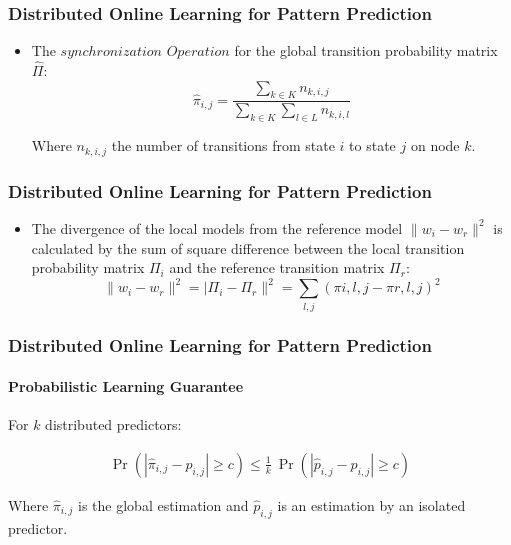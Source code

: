 \frame
{
	\frametitle{Distributed Online Learning for Pattern Prediction}
	\begin{itemize}[]

	\item<1-> The
 $synchronization$ $ Operation$ for the global transition probability matrix $\hat{\Pi}$:
 \begin{equation*}
 \label{eq:dis_pi_estim}
 \hat{\pi}_{i,j} = \frac{\sum_{k \in K} n_{k,i,j}}{\sum_{k \in K} \sum_{l \in L} n_{k,i,l}}
 \end{equation*}

Where $n_{k,i,j}$ the number of transitions from state $i$ to state $j$ on node $k$.
	
\end{itemize}
}

\frame
{
	\frametitle{Distributed Online Learning for Pattern Prediction}
	\begin{itemize}[]
		
		\item<1->The divergence of the local models from the reference model $\|w_i - w_r\|^2$ is calculated by the sum of square difference between the local transition probability matrix $\Pi_i$ and the reference transition matrix $\Pi_r$:
		\begin{equation*}
		\label{eq:dis_pi_varinace}
		\|w_i - w_r\|^2=|\Pi_i - \Pi_r\|^2=\sum_{l,j} (\pi{i,l,j} -\pi{r,l,j})^2
		\end{equation*}
		
	\end{itemize}
}


\frame
{
	\frametitle{Distributed Online Learning for Pattern Prediction}
	\framesubtitle{Probabilistic Learning Guarantee}
For $k$ distributed \pmcmr predictors:
		
		\begin{equation*}
		\begin{aligned}
		\label{eq:guarantee}
		\Pr\left( |\hat{\pi}_{i,j} - {p}_{i,j}| \geq c \right) \leq
		\frac{1}{k}\ \Pr\left( |\hat{p}_{i,j} - {p}_{i,j}| \geq c \right)
		\end{aligned}
		\end{equation*}
		
\vspace{1cm}Where $\hat{\pi}_{i,j}$ is the global estimation and $\hat{p}_{i,j}$ is an estimation by an isolated predictor.
}